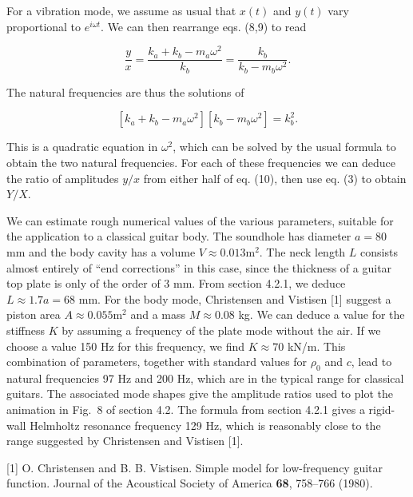   For a vibration mode, we assume as usual that $x(t)$ and $y(t)$ vary 
  proportional to $e^{i \omega t}$. We can then rearrange eqs. (8,9) to read 

  $$\dfrac{y}{x}=\dfrac{k_a+k_b-m_a \omega^2}{k_b} = \dfrac{k_b}{k_b-m_b 
  \omega^2} . \tag{10}$$ 

  The natural frequencies are thus the solutions of 

  $$\left[ k_a+k_b-m_a \omega^2 \right] \left[ k_b-m_b \omega^2 \right] = k_b^2 
  . \tag{11}$$ 

  This is a quadratic equation in $\omega^2$, which can be solved by the usual 
  formula to obtain the two natural frequencies. For each of these frequencies 
  we can deduce the ratio of amplitudes $y/x$ from either half of eq. (10), 
  then use eq. (3) to obtain $Y/X$. 

  We can estimate rough numerical values of the various parameters, suitable 
  for the application to a classical guitar body. The soundhole has diameter 
  $a=80$ mm and the body cavity has a volume $V \approx 0.013 \mathrm{m}^2$. 
  The neck length $L$ consists almost entirely of ``end corrections'' in this 
  case, since the thickness of a guitar top plate is only of the order of 3 mm. 
  From section 4.2.1, we deduce $L \approx 1.7 a = 68$ mm. For the body mode, 
  Christensen and Vistisen [1] suggest a piston area $A \approx 0.055 
  \mathrm{m}^2$ and a mass $M \approx 0.08$ kg. We can deduce a value for the 
  stiffness $K$ by assuming a frequency of the plate mode without the air. If 
  we choose a value 150 Hz for this frequency, we find $K \approx 70$ kN/m. 
  This combination of parameters, together with standard values for $\rho_0$ 
  and $c$, lead to natural frequencies 97 Hz and 200 Hz, which are in the 
  typical range for classical guitars. The associated mode shapes give the 
  amplitude ratios used to plot the animation in Fig.\ 8 of section 4.2. The 
  formula from section 4.2.1 gives a rigid-wall Helmholtz resonance frequency 
  129 Hz, which is reasonably close to the range suggested by Christensen and 
  Vistisen [1]. 

  \sectionreferences{}[1] O. Christensen and B. B. Vistisen. Simple model for 
  low-frequency guitar function. Journal of the Acoustical Society of America 
  \textbf{68}, 758–766 (1980). 